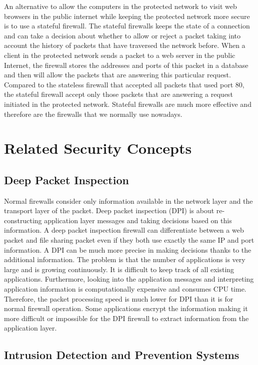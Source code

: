 An alternative to allow the computers in the protected network to visit web browsers in the public internet while keeping the protected network more secure is to use a stateful firewall.
The stateful firewalls keeps the state of a connection and can take a decision about whether to allow or reject a packet taking into account the history of packets that have traversed the network before.
When a client in the protected network sends a packet to a web server in the public Internet, the firewall stores the addresses and ports of this packet in a database and then will allow the packets that are answering this particular request.
Compared to the stateless firewall that accepted all packets that used port 80, the stateful firewall accept only those packets that are answering a request initiated in the protected network.
Stateful firewalls are much more effective and therefore are the firewalls that we normally use nowadays.

\section{Related Security Concepts}

\subsection{Deep Packet Inspection}

Normal firewalls consider only information available in the network layer and the transport layer of the packet.
Deep packet inspection (DPI) is about re-constructing application layer messages and taking decisions based on this information.
A deep packet inspection firewall can differentiate between a web packet and file sharing packet even if they both use exactly the same IP and port information.
A DPI can be much more precise in making decisions thanks to the additional information.
The problem is that the number of applications is very large and is growing continuously.
It is difficult to keep track of all existing applications. 
Furthermore, looking into the application messages and interpreting application information is computationally expensive and consumes CPU time.
Therefore, the packet processing speed is much lower for DPI than it is for normal firewall operation.
Some applications encrypt the information making it more difficult or impossible for the DPI firewall to extract information from the application layer.

\subsection{Intrusion Detection and Prevention Systems}

